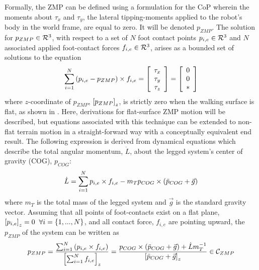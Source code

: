 		Formally, the ZMP can be defined using a formulation for the CoP wherein the moments about $\tau_{x}$ and $\tau_{y}$, the lateral tipping-moments applied to the robot's body in the world frame, are equal to zero. It will be denoted $p_{ZMP}$. The solution for $p_{ZMP}\in{\cal R}^{3}$, with respect to a set of $N$ foot contact points $p_{i,e}\in{\cal R}^{3}$ and $N$ associated applied foot-contact forces $f_{i,e}\in{\cal R}^{3}$, arises as a bounded set of solutions to the equation
			\begin{equation}
				\sum^{N}_{i=1}\left(p_{i,e}-p_{ZMP}\right)\times f_{i,e} 
				= 
				\left[
					\begin{array}{c}
						\tau_{x}	\\
						\tau_{y}	\\
						\tau_{z}
					\end{array}
				\right]
				=
				\left[
					\begin{array}{c}
						0			\\
						0			\\
						*
					\end{array}
				\right]
			\end{equation}
		where $z$-coordinate of $p_{ZMP}$, $\left[p_{ZMP}\right]_{z}$, is strictly zero when the walking surface is flat, as shown in \cite{Wieber2015}. Here, derivations for flat-surface ZMP motion will be described, but equations associated with this technique can be extended to non-flat terrain motion in a straight-forward way with a conceptually equivalent end result. The following expression is derived from dynamical equations which describe the total angular momentum, $\dot{L}$, about the legged system's center of gravity (COG), $p_{COG}$:
			\begin{equation}
				\dot{L} = \sum_{i=1}^{N} p_{i,e}\times f_{i,e} - m_{T} p_{COG} \times \left( \ddot{p}_{COG} + \vec{g} \right)
			\end{equation}
		where $m_{T}$ is the total mass of the legged system and $\vec{g}$ is the standard gravity vector. Assuming that all points of foot-contacts exist on a flat plane, \IE $\left[p_{i,e}\right]_{z}=0\hspace{2mm} \forall i=\{1,...,N\}$, and all contact force, $f_{i,e}$ are pointing upward, the $p_{ZMP}$ of the system can be written as
			\begin{equation}
				p_{ZMP} 
				= 
				\frac{ \sum_{i=1}^{N} \left( p_{i,e} \times f_{i,e} \right) }{ \left[\sum_{i=1}^{N} f_{i,e}\right]_{z} }
				= 
				\frac{ 	p_{COG} \times \left( \ddot{p}_{COG} + \vec{g} \right) + \dot{L}m_{T}^{-1} }{ \left[ \ddot{p}_{COG} + \vec{g} \right]_{z}}
				\in {\cal C}_{ZMP} 
			\end{equation}
